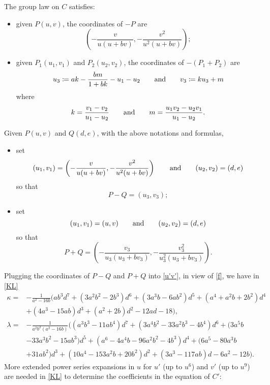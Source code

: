 \documentclass{gtpart}
\theoremstyle{definition}
\theoremstyle{remark}
\newcommand{\ad}{{\rm and}}
\newcommand{\K}{\kappa}
\begin{document}
The group law on $C$ satisfies: 
\begin{itemize}
 \item given $P(u,v)$, the coordinates of $-P$ are 
 \[
  \left( -\frac{v}{u (u + b v)},-\frac{v^2}{u^2 (u + b v)} \right); 
 \]

 \item given $P_1(u_1,v_1)$ and $P_2(u_2,v_2)$, the coordinates of 
 $-(P_1 + P_2)$ are 
 \[
  u_3 \coloneqq a k - \frac{b m}{1 + b k} - u_1 - u_2 \qquad \ad \qquad v_3 \coloneqq k u_3 + m 
 \]
 where 
 \[
  k = \frac{v_1 - v_2}{u_1 - u_2} \qquad \ad \qquad m = \frac{u_1 v_2 - u_2 v_1}{u_1 - u_2}.  
 \]
\end{itemize}
Given $P(u,v)$ and $Q(d,e)$, with the above notations and formulas, 
\begin{itemize}
 \item set 
 \[
  (u_1,v_1) = \left( -\frac{v}{u (u + b v)},-\frac{v^2}{u^2 (u + b v)} \right) \qquad \ad \qquad (u_2,v_2) = (d,e) 
 \]
 so that 
 \[
  P - Q = (u_3,v_3); 
 \]

 \item set 
 \[
  (u_1,v_1) = (u,v) \qquad \ad \qquad (u_2,v_2) = (d,e) 
 \]
 so that 
 \[
  P + Q = \left( -\frac{v_3}{u_3 (u_3 + b v_3)},-\frac{v_3^2}{u_3^2 (u_3 + b v_3)} \right).  
 \]
\end{itemize}
Plugging the coordinates of $P - Q$ and $P + Q$ into \eqref{u'v'}, in 
view of \eqref{f}, we have in \eqref{KL} 
\begin{equation*}
\begin{split}
      \K = & -\frac{1}{a^2 - 16 b} \big( a b^3 d^7 + (3 a^2 b^2 - 2 b^3) d^6 + (3 a^3 b - 6 a b^2) d^5 + (a^4 + a^2 b + 2 b^2) d^4 \\
           & + (4 a^3 - 15 a b) d^3 + (a^2 + 2 b) d^2 - 12 a d - 18 \big), \\
 \lambda = & -\frac{1}{a^2 b^2 (a^2 - 16 b)} \big( (a^3  b^3 - 11 a b^4) d^7 + (3 a^4 b^2 - 33 a^2 b^3 - 4 b^4) d^6 + (3 a^5 b \\
           & - 33 a^3 b^2 - 15 a b^3) d^5 + (a^6 - 4 a^4 b - 96 a^2 b^2 - 4 b^3) d^4 + (6 a^5 - 80 a^3 b \\
           & + 31 a b^2) d^3 + (10 a^4 - 153 a^2 b + 20 b^2) d^2 + (3 a^3 - 117 a b) d - 6 a^2 - 12 b \big).  
\end{split}
\end{equation*}
More extended power series expansions in $u$ for $u'$ (up to $u^6$) and 
$v'$ (up to $u^9$) are needed in \eqref{KL} to determine the 
coefficients in the equation of $C'$: 
\end{document}
